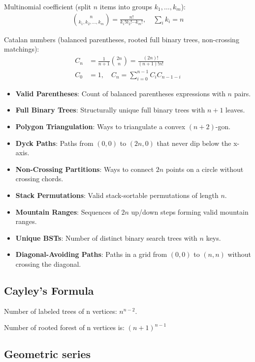 \documentclass[10pt,letterpaper,landscape,twocolumn]{article}
\begin{document}
Multinomial coefficient (split $n$ items into groups $k_1,\dots,k_m$):
\begin{align*}
\binom{n}{k_1,k_2,\dots,k_m} = \frac{n!}{k_1!k_2!\cdots k_m!}, \quad \sum_i k_i = n
\end{align*}

Catalan numbers (balanced parentheses, rooted full binary trees, non-crossing matchings):
\begin{align*}
C_n &= \frac{1}{n+1}\binom{2n}{n} = \frac{(2n)!}{(n+1)!n!} \\
C_0 &= 1, \quad C_n = \sum_{i=0}^{n-1} C_i C_{n-1-i}
\end{align*}

\begin{itemize}
    \item \textbf{Valid Parentheses}: Count of balanced parentheses expressions with \( n \) pairs.
    \item \textbf{Full Binary Trees}: Structurally unique full binary trees with \( n+1 \) leaves.
    \item \textbf{Polygon Triangulation}: Ways to triangulate a convex \( (n+2) \)-gon.
    \item \textbf{Dyck Paths}: Paths from \( (0,0) \) to \( (2n,0) \) that never dip below the x-axis.
    \item \textbf{Non-Crossing Partitions}: Ways to connect \( 2n \) points on a circle without crossing chords.
    \item \textbf{Stack Permutations}: Valid stack-sortable permutations of length \( n \).
    \item \textbf{Mountain Ranges}: Sequences of \( 2n \) up/down steps forming valid mountain ranges.
    \item \textbf{Unique BSTs}: Number of distinct binary search trees with \( n \) keys.
    \item \textbf{Diagonal-Avoiding Paths}: Paths in a grid from \( (0,0) \) to \( (n,n) \) without crossing the diagonal.
\end{itemize}


\subsection{Cayley's Formula}

Number of labeled trees of n vertices: $n^{n-2}$.

Number of rooted forest of n vertices is: $(n+1)^{n-1}$

\subsection{Geometric series}
\end{document}

